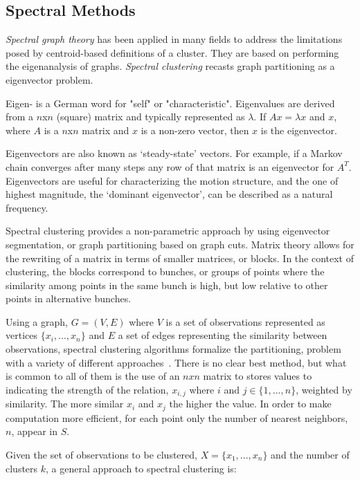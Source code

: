\subsection{Spectral Methods}
\label{subsec:sc}
\emph{Spectral graph theory} has been applied in many fields to address the limitations posed by centroid-based definitions of a cluster.  They are based on performing the eigenanalysis of graphs.  \emph{Spectral clustering} recasts graph partitioning as a eigenvector problem.

Eigen- is a German word for "self" or "characteristic".  Eigenvalues are derived from a $n$x$n$ (square) matrix and typically represented as $\lambda$.  If $Ax = \lambda x$ and $x$, where $A$ is a $n$x$n$ matrix and $x$ is a non-zero vector, then $x$ is the eigenvector.

Eigenvectors are also known as `steady-state' vectors.   For example, if a Markov chain converges after many steps any row of that matrix is an eigenvector for $A^T$.   Eigenvectors are useful for characterizing the motion structure, and the one of highest magnitude, the `dominant eigenvector', can be described as a natural frequency.

Spectral clustering provides a non-parametric approach by using eigenvector segmentation, or graph partitioning based on graph cuts.  Matrix theory allows for the rewriting of a matrix in terms of smaller matrices, or blocks.  In the context of clustering, the blocks correspond to bunches, or groups of points where the similarity among points in the same bunch is high, but low relative to other points in alternative bunches.

Using a graph, $G=(V,E)$ where $V$ is a set of observations represented as vertices $\{x_{i}, . . . , x_{n}\}$ and $E$ a set of edges representing the similarity between observations, spectral clustering algorithms formalize the partitioning, problem with a variety of different approaches~\cite{Shi00,Ng01onspectral}.  There is no clear best method, but what is common to all of them is the use of an $nxn$ matrix to stores values to indicating the strength of the relation, $x_{i,j}$ where $i$ and $j\in \{1,...,n\}$, weighted by similarity.  The more similar $x_{i}$ and $x_{j}$ the higher the value.  In order to make computation more efficient, for each point only the number of nearest neighbors, $n$, appear in $S$.

Given the set of observations to be clustered, $X=\{x_{1}, . . . , x_{n}\}$ and the number of clusters $k$, a general approach to spectral clustering is:

